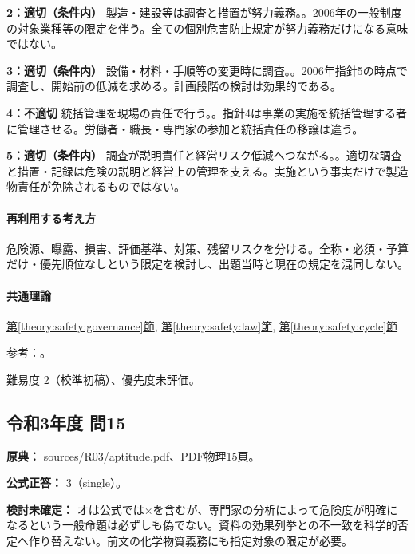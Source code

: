 \noindent\textbf{2：適切（条件内）} 製造・建設等は調査と措置が努力義務。。2006年の一般制度の対象業種等の限定を伴う。全ての個別危害防止規定が努力義務だけになる意味ではない。\par

\noindent\textbf{3：適切（条件内）} 設備・材料・手順等の変更時に調査。。2006年指針5の時点で調査し、開始前の低減を求める。計画段階の検討は効果的である。\par

\noindent\textbf{4：不適切} 統括管理を現場の責任で行う。。指針4は事業の実施を統括管理する者に管理させる。労働者・職長・専門家の参加と統括責任の移譲は違う。\par

\noindent\textbf{5：適切（条件内）} 調査が説明責任と経営リスク低減へつながる。。適切な調査と措置・記録は危険の説明と経営上の管理を支える。実施という事実だけで製造物責任が免除されるものではない。\par

\paragraph{再利用する考え方} 危険源、曝露、損害、評価基準、対策、残留リスクを分ける。全称・必須・予算だけ・優先順位なしという限定を検討し、出題当時と現在の規定を混同しない。

\paragraph{共通理論} \hyperref[theory:safety:governance]{第\ref*{theory:safety:governance}節}, \hyperref[theory:safety:law]{第\ref*{theory:safety:law}節}, \hyperref[theory:safety:cycle]{第\ref*{theory:safety:cycle}節}

\par 参考：\cite{saf_ra2006,saf_ra_effects}。

\par 難易度 2（校準初稿）、優先度未評価。

\subsection{令和3年度 問15}
\label{q:r03-reg-apt-15}

\noindent\textbf{原典：} sources/R03/aptitude.pdf、PDF物理15頁。

\textbf{公式正答：} 3（single）。

\par\textbf{検討未確定：} オは公式では×を含むが、専門家の分析によって危険度が明確になるという一般命題は必ずしも偽でない。資料の効果列挙との不一致を科学的否定へ作り替えない。前文の化学物質義務にも指定対象の限定が必要。

